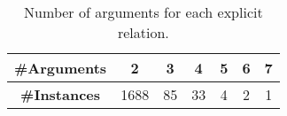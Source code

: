 \begin{table}[ht]
\centering
\begin{tabular}{|c|c|c|c|c|c|c|}
\hline

\bf \#Arguments              & 2    & 3   & 4   & 5   & 6  & 7  \\ \hline
\bf \#Instances              & 1688 & 85  & 33  & 4   & 2  & 1  \\ \hline

\end{tabular}
\caption{\label{t:argument-num} Number of arguments for each explicit relation. }
\end{table}
